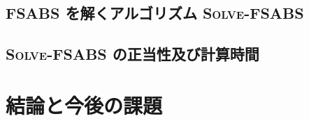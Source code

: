 \documentclass[12pt,epsf]{jreport}
\begin{document}
\section{FSABS を解くアルゴリズム \textsc{Solve-FSABS}}

\section{\textsc{Solve-FSABS} の正当性及び計算時間}

\chapter{結論と今後の課題}\label{chapter:conclusion}


\renewcommand{\refname}{参考文献}
\nocite{*}
\printbibliography[title=参考文献]


\printindex
\end{document}
